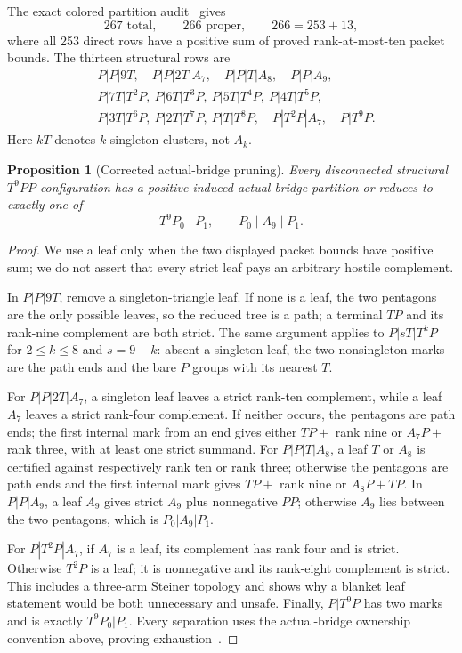 \documentclass[11pt]{article}
\newtheorem{proposition}[theorem]{Proposition}
\theoremstyle{remark}
\begin{document}
The exact colored partition audit~\cite{Partitions} gives
\[
 267\text{ total},\qquad266\text{ proper},\qquad
 \boxed{266=253+13},
\]
where all 253 direct rows have a positive sum of proved rank-at-most-ten packet
bounds.  The thirteen structural rows are
\begin{align*}
 &P|P|9T,\quad P|P|2T|A_7,\quad P|P|T|A_8,\quad P|P|A_9,\\
 &P|7T|T^2P,\ P|6T|T^3P,\ P|5T|T^4P,\ P|4T|T^5P,\\
 &P|3T|T^6P,\ P|2T|T^7P,\ P|T|T^8P,\quad
 P|T^2P|A_7,\quad P|T^9P.
\end{align*}
Here $kT$ denotes $k$ singleton clusters, not $A_k$.

\begin{proposition}[Corrected actual-bridge pruning]\label{prop:prune}
Every disconnected structural $T^9PP$ configuration has a positive induced
actual-bridge partition or reduces to exactly one of
\[
 \boxed{T^9P_0\mid P_1},\qquad
 \boxed{P_0\mid A_9\mid P_1}.
\]
\end{proposition}

\begin{proof}
We use a leaf only when the two displayed packet bounds have positive sum; we
do not assert that every strict leaf pays an arbitrary hostile complement.

In $P|P|9T$, remove a singleton-triangle leaf.  If none is a leaf, the two
pentagons are the only possible leaves, so the reduced tree is a path; a
terminal $TP$ and its rank-nine complement are both strict.  The same argument
applies to $P|sT|T^kP$ for $2\leq k\leq8$ and $s=9-k$: absent a singleton leaf,
the two nonsingleton marks are the path ends and the bare $P$ groups with its
nearest $T$.

For $P|P|2T|A_7$, a singleton leaf leaves a strict rank-ten complement, while a
leaf $A_7$ leaves a strict rank-four complement.  If neither occurs, the
pentagons are path ends; the first internal mark from an end gives either
$TP+$ rank nine or $A_7P+$ rank three, with at least one strict summand.  For
$P|P|T|A_8$, a leaf $T$ or $A_8$ is certified against respectively rank ten or
rank three; otherwise the pentagons are path ends and the first internal mark
gives $TP+$ rank nine or $A_8P+TP$.  In $P|P|A_9$, a leaf $A_9$ gives strict
$A_9$ plus nonnegative $PP$; otherwise $A_9$ lies between the two pentagons,
which is $P_0|A_9|P_1$.

For $P|T^2P|A_7$, if $A_7$ is a leaf, its complement has rank four and is
strict.  Otherwise $T^2P$ is a leaf; it is nonnegative and its rank-eight
complement is strict.  This includes a three-arm Steiner topology and shows why
a blanket leaf statement would be both unnecessary and unsafe.  Finally,
$P|T^9P$ has two marks and is exactly $T^9P_0|P_1$.  Every separation uses the
actual-bridge ownership convention above, proving exhaustion~\cite{Pruning}.
\end{proof}
\end{document}
